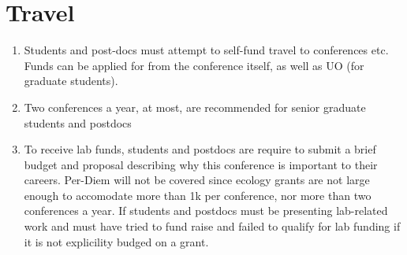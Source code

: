 \documentclass[12pt]{article}
\begin{document}
\section{Travel}
\begin{enumerate}
\item Students and post-docs must attempt to self-fund travel to
  conferences etc. Funds can be applied for from the conference
  itself, as well as UO (for graduate students). 
\item Two conferences a year, at most, are recommended
  for senior graduate students and postdocs
\item To receive lab funds, students and postdocs are require to
  submit a brief budget and proposal describing why this conference is
  important to their careers. Per-Diem will not be covered since
  ecology grants are not large enough to accomodate more than 1k per
  conference, nor more than two conferences a year. If students and
  postdocs must be presenting lab-related work and must have tried to
  fund raise and failed to qualify for lab funding if it is not
  explicility budged on a grant.
\end{enumerate}
\end{document}
